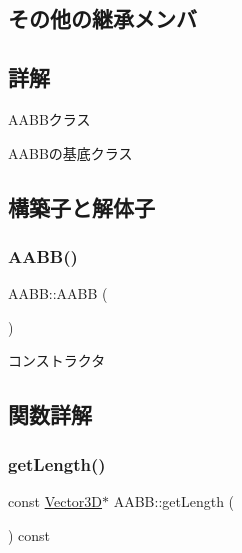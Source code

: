 \subsection*{その他の継承メンバ}


\subsection{詳解}
A\+A\+B\+Bクラス 

A\+A\+B\+Bの基底クラス 

\subsection{構築子と解体子}
\mbox{\label{class_a_a_b_b_a5f5baf6c533905aa1456b3a3eb57bab2}} 
\subsubsection{\texorpdfstring{A\+A\+B\+B()}{AABB()}}
{\footnotesize\ttfamily A\+A\+B\+B\+::\+A\+A\+BB (\begin{DoxyParamCaption}{ }\end{DoxyParamCaption})\hspace{0.3cm}{\ttfamily [inline]}}



コンストラクタ 



\subsection{関数詳解}
\mbox{\label{class_a_a_b_b_a74b2c6a6acde4bf37eb0333358349fca}} 
\subsubsection{\texorpdfstring{get\+Length()}{getLength()}}
{\footnotesize\ttfamily const \mbox{\hyperlink{class_vector3_d}{Vector3D}}$\ast$ A\+A\+B\+B\+::get\+Length (\begin{DoxyParamCaption}{ }\end{DoxyParamCaption}) const\hspace{0.3cm}{\ttfamily [inline]}}

\mbox{\label{class_a_a_b_b_a8dc63902fbb2c8f83185bbe9feaaa4b0}} 
